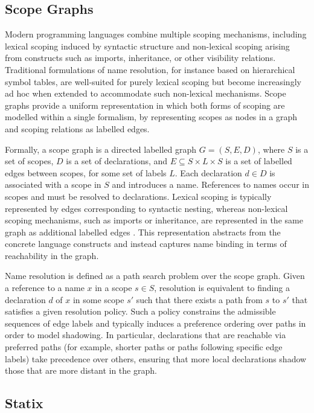 \subsection{Scope Graphs}

Modern programming languages combine multiple scoping mechanisms, including lexical scoping induced by syntactic structure and non-lexical scoping arising from constructs such as imports, inheritance, or other visibility relations. Traditional formulations of name resolution, for instance based on hierarchical symbol tables, are well-suited for purely lexical scoping but become increasingly ad hoc when extended to accommodate such non-lexical mechanisms. Scope graphs provide a uniform representation in which both forms of scoping are modelled within a single formalism, by representing scopes as nodes in a graph and scoping relations as labelled edges.

Formally, a scope graph is a directed labelled graph $G = (S, E, D)$, where $S$ is a set of scopes, $D$ is a set of declarations, and $E \subseteq S \times L \times S$ is a set of labelled edges between scopes, for some set of labels $L$. Each declaration $d \in D$ is associated with a scope in $S$ and introduces a name. References to names occur in scopes and must be resolved to declarations. Lexical scoping is typically represented by edges corresponding to syntactic nesting, whereas non-lexical scoping mechanisms, such as imports or inheritance, are represented in the same graph as additional labelled edges \autocite{van_antwerpen_scopes_2018}. This representation abstracts from the concrete language constructs and instead captures name binding in terms of reachability in the graph.

Name resolution is defined as a path search problem over the scope graph. Given a reference to a name $x$ in a scope $s \in S$, resolution is equivalent to finding a declaration $d$ of $x$ in some scope $s'$ such that there exists a path from $s$ to $s'$ that satisfies a given resolution policy. Such a policy constrains the admissible sequences of edge labels and typically induces a preference ordering over paths in order to model shadowing. In particular, declarations that are reachable via preferred paths (for example, shorter paths or paths following specific edge labels) take precedence over others, ensuring that more local declarations shadow those that are more distant in the graph.

\subsection{Statix}

